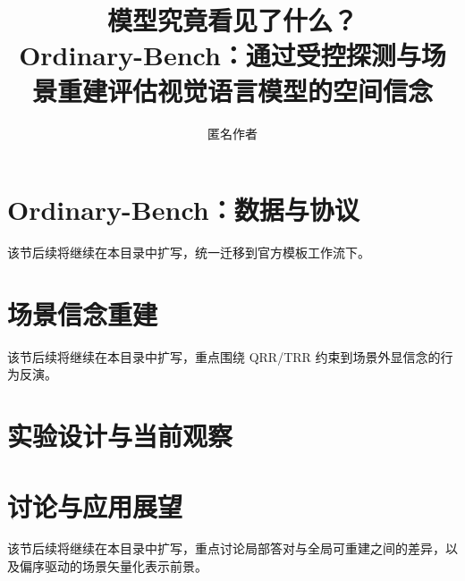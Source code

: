 \documentclass{article}
\title{模型究竟看见了什么？\\
Ordinary-Bench：通过受控探测与场景重建评估视觉语言模型的空间信念}
\author{匿名作者}
\begin{document}
\maketitle

\begin{abstract}

\end{abstract}




\section{Ordinary-Bench：数据与协议}
该节后续将继续在本目录中扩写，统一迁移到官方模板工作流下。

\section{场景信念重建}
该节后续将继续在本目录中扩写，重点围绕 QRR/TRR 约束到场景外显信念的行为反演。

\section{实验设计与当前观察}


\section{讨论与应用展望}
该节后续将继续在本目录中扩写，重点讨论局部答对与全局可重建之间的差异，以及偏序驱动的场景矢量化表示前景。



\end{document}
